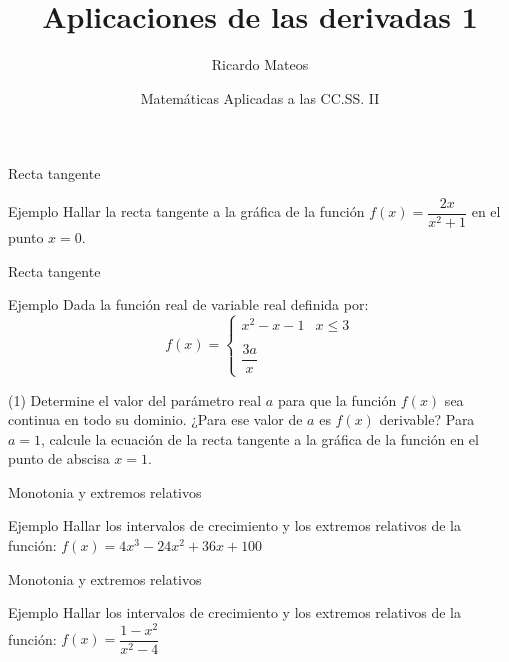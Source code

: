 \documentclass[8pt]{beamer}
\title{Aplicaciones de las derivadas 1}
\author{Ricardo Mateos}
\institute[UHEI-IVED]{Departamento de Matemáticas \\ UHEI - IVED}
\date{Matemáticas Aplicadas a las CC.SS. II}
\begin{document}
\begin{frame}
\maketitle
\end{frame}

\begin{frame}
\tableofcontents
\end{frame}

\begin{frame}[t]{Recta tangente}
\begin{exampleblock}{Ejemplo}
Hallar la recta tangente a la gráfica de la función $f(x)=\dfrac{2x}{x^2+1}$ en el punto $x=0$.
\end{exampleblock}
\end{frame}

\begin{frame}[t]{Recta tangente}
\begin{exampleblock}{Ejemplo}
Dada la función real de variable real definida por:
\[ f(x)= \begin{cases} x^2-x-1 & x \leq 3 \\ \\ \dfrac{3a}{x} \end{cases} \]
\begin{tasks}[label=\alph*)](1)
\task Determine el valor del parámetro real $a$ para que la función $f(x)$ sea continua en todo su dominio. ¿Para ese valor de $a$ es $f(x)$ derivable?
\task Para $a = 1$, calcule la ecuación de la recta tangente a la gráfica de la función en el punto de abscisa $x = 1$.
\end{tasks}

\end{exampleblock}
\end{frame}

\begin{frame}[t]{Monotonia y extremos relativos}
\begin{exampleblock}{Ejemplo}
Hallar los intervalos de crecimiento y los extremos relativos de la función: $f(x)=4x^3-24x^2+36x+100$
\end{exampleblock}
\end{frame}

\begin{frame}[t]{Monotonia y extremos relativos}
\begin{exampleblock}{Ejemplo}
Hallar los intervalos de crecimiento y los extremos relativos de la función: $f(x)=\dfrac{1-x^2}{x^2-4}$
\end{exampleblock}
\end{frame}
\end{document}
